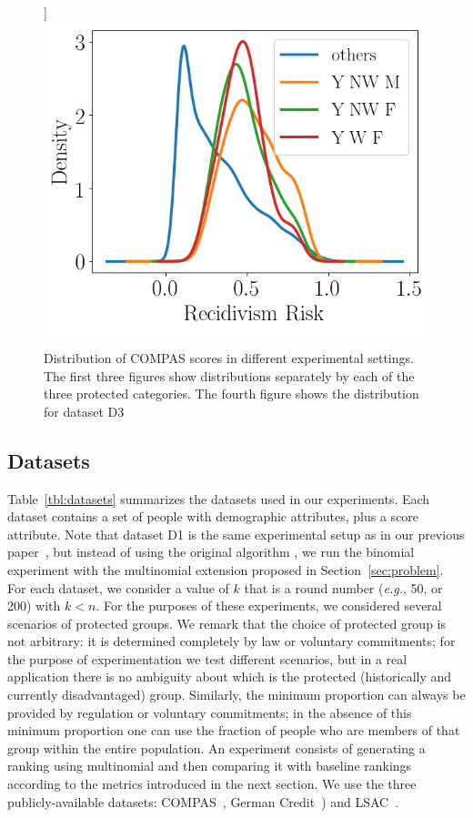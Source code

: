 \begin{figure}[t]
	\label{fig:dataset:compas:worstThree}]
	{\includegraphics[width=.48\textwidth]{pics/compas_worstThreeGroups_kde.png}}\hfill
	\vspace{-3mm}
	\caption{Distribution of COMPAS scores in different experimental settings. The first three figures show distributions separately by each of the three protected categories. The fourth figure shows the distribution for dataset D3}
	\label{fig:dataset:compas}
	\vspace{-3mm}
\end{figure}

\subsection{Datasets}\label{sec:experiments-datasets}


Table~\ref{tbl:datasets} summarizes the datasets used in our experiments.
%
Each dataset contains a set of people with demographic attributes, plus a score attribute.
%
Note that dataset D1 is the same experimental setup as in our previous paper~\cite{zehlike2017fair}, but instead of using the original algorithm \algoFAIR, we run the binomial experiment with the multinomial extension proposed in Section~\ref{sec:problem}.
%
For each dataset, we consider a value of $k$ that is a round number ({\em e.g.}, 50, or 200) with $k<n$.
%
For the purposes of these experiments, we considered several scenarios of protected groups.
%
We remark that the choice of protected group is not arbitrary: it is determined completely by law or voluntary commitments; for the purpose of experimentation we test different scenarios, but in a real application there is no ambiguity about which is the protected (historically and currently disadvantaged) group.
%
Similarly, the minimum proportion can always be provided by regulation or voluntary commitments; in the absence of this minimum proportion one can use the fraction of people who are members of that group within the entire population.
%
An experiment consists of generating a ranking using multinomial \algoFAIR and then comparing it with baseline rankings according to the metrics introduced in the next section.
%
We use the three publicly-available datasets: COMPAS~\cite{angwin_2016_machine}, German Credit~\cite{lichman_2013_uci}) and LSAC~\cite{wightman1998lsac}.

